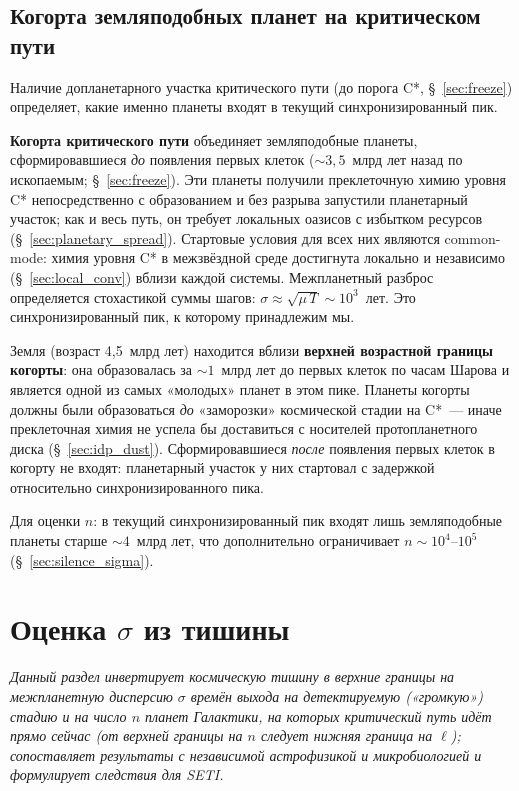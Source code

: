 \documentclass[12pt,a4paper]{article}
\begin{document}
\subsection{Когорта земляподобных планет на критическом пути}
\label{sec:bimodal}

Наличие допланетарного участка критического пути (до порога C*, \S~\ref{sec:freeze}) определяет, какие именно планеты входят в текущий синхронизированный пик.

\textbf{Когорта критического пути} объединяет земляподобные планеты, сформировавшиеся \emph{до} появления первых клеток ($\sim 3{,}5$~млрд лет назад по ископаемым; \S~\ref{sec:freeze}). Эти планеты получили преклеточную химию уровня C* непосредственно с образованием и без разрыва запустили планетарный участок; как и весь путь, он требует локальных оазисов с избытком ресурсов (\S~\ref{sec:planetary_spread}). Стартовые условия для всех них являются common-mode: химия уровня C* в межзвёздной среде достигнута локально и независимо (\S~\ref{sec:local_conv}) вблизи каждой системы. Межпланетный разброс определяется стохастикой суммы шагов: $\sigma \approx \sqrt{\mu\,T} \sim 10^3$~лет. Это синхронизированный пик, к которому принадлежим мы.

Земля (возраст 4,5~млрд лет) находится вблизи \textbf{верхней возрастной границы когорты}: она образовалась за $\sim 1$~млрд лет до первых клеток по часам Шарова и является одной из самых «молодых» планет в этом пике. Планеты когорты должны были образоваться \emph{до} «заморозки» космической стадии на C*~--- иначе преклеточная химия не успела бы доставиться с носителей протопланетного диска (\S~\ref{sec:idp_dust}). Сформировавшиеся \emph{после} появления первых клеток в когорту не входят: планетарный участок у них стартовал с задержкой относительно синхронизированного пика.

Для оценки $n$: в текущий синхронизированный пик входят лишь земляподобные планеты старше $\sim 4$~млрд лет, что дополнительно ограничивает $n \sim 10^4$--$10^5$ (\S~\ref{sec:silence_sigma}).

\section{Оценка \texorpdfstring{$\sigma$}{σ} из тишины}
\label{sec:inversion}

\textit{Данный раздел инвертирует космическую тишину в \emph{верхние границы} на межпланетную дисперсию $\sigma$ времён выхода на детектируемую («громкую») стадию и на число $n$ планет Галактики, на которых критический путь идёт прямо сейчас (от верхней границы на $n$ следует нижняя граница на $\ell$); сопоставляет результаты с независимой астрофизикой и микробиологией и формулирует следствия для SETI.}
\end{document}
